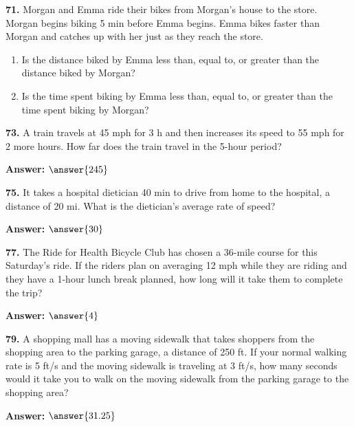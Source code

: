\documentclass{ximera}
\begin{document}
\begin{problem}
\textbf{71.} Morgan and Emma ride their bikes from Morgan's house to the store. Morgan begins
  biking 5 min before Emma begins. Emma bikes faster than Morgan and catches up with her
  just as they reach the store.
  \begin{enumerate}[label=\textbf{\alph*.},leftmargin=2em,topsep=2pt,itemsep=1pt]
    \item Is the distance biked by Emma less than, equal to, or greater than the
          distance biked by Morgan?
    \item Is the time spent biking by Emma less than, equal to, or greater than the time
          spent biking by Morgan?
  \end{enumerate}

\begin{multipleChoice}
\end{multipleChoice}
\end{problem}

\begin{problem}
\textbf{73.} A train travels at 45 mph for 3 h and then increases its speed to 55 mph for 2
  more hours. How far does the train travel in the 5-hour period?

\textbf{Answer:} $\answer{245}$
\end{problem}

\begin{problem}
\textbf{75.} It takes a hospital dietician 40 min to drive from home to the hospital, a
  distance of 20 mi. What is the dietician's average rate of speed?

\textbf{Answer:} $\answer{30}$
\end{problem}

\begin{problem}
\textbf{77.} The Ride for Health Bicycle Club has chosen a 36-mile course for this Saturday's
  ride. If the riders plan on averaging 12 mph while they are riding and they have a
  1-hour lunch break planned, how long will it take them to complete the trip?

\textbf{Answer:} $\answer{4}$
\end{problem}

\begin{problem}
\textbf{79.} A shopping mall has a moving sidewalk that takes shoppers from the shopping area
  to the parking garage, a distance of 250 ft. If your normal walking rate is 5 ft/s and
  the moving sidewalk is traveling at 3 ft/s, how many seconds would it take you to walk
  on the moving sidewalk from the parking garage to the shopping area?

\textbf{Answer:} $\answer{31.25}$
\end{problem}
\end{document}
